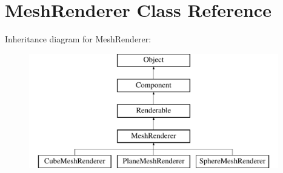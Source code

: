\hypertarget{class_mesh_renderer}{
\section{MeshRenderer Class Reference}
\label{class_mesh_renderer}
}
Inheritance diagram for MeshRenderer:\begin{figure}[H]
\begin{center}
\leavevmode
\includegraphics[height=5.000000cm]{class_mesh_renderer}
\end{center}
\end{figure}
